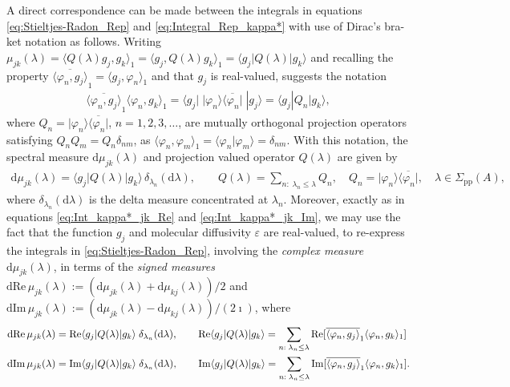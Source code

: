 \documentclass[11pt]{amsart}
\renewcommand{\d}{\mathrm{d}}
\newcommand{\Sigp}{\Sigma_{\text{pp}}}
\begin{document}
A direct correspondence can be made between the integrals in equations
\eqref{eq:Stieltjes-Radon_Rep} and \eqref{eq:Integral_Rep_kappa*} with
use of Dirac's bra-ket notation as follows. Writing  
$\mu_{jk}(\lambda)=\langle Q(\lambda)g_j,g_k\rangle_1=\langle g_j,Q(\lambda)g_k\rangle_1=\langle g_j|Q(\lambda)|g_k\rangle$ and
recalling the property
$\overline{\langle\varphi_n,g_j\rangle}_1=\langle g_j,\varphi_n\rangle_1$ and that $g_j$ is real-valued, suggests  
the notation  
%
\begin{align}\label{eq:Disc_Meas_Weights}
  \overline{\langle\varphi_n,g_j\rangle}_1\langle\varphi_n,g_k\rangle_1
  =\langle g_j|\;|\varphi_n\rangle\overline{\langle\varphi_n|}\;|g_j\rangle
  =\langle g_j|Q_n|g_k\rangle,
\end{align}
%
where $Q_n=|\varphi_n\rangle\overline{\langle\varphi_n|}$, $n=1,2,3,\ldots$, are mutually orthogonal
projection operators satisfying $Q_nQ_m=Q_n\delta_{nm}$, as
$\langle\varphi_n,\varphi_m\rangle_1=\langle\varphi_n|\varphi_m\rangle=\delta_{nm}$. With this notation, the spectral
measure $\d\mu_{jk}(\lambda)$ and projection valued operator $Q(\lambda)$ are
given by   
%
\begin{align}\label{eq:Disc_Spec_Measure_Inf}
  \d\mu_{jk}(\lambda)=\langle g_j|Q(\lambda)|g_k\rangle\,\delta_{\lambda_n}(\d\lambda),\qquad
  Q(\lambda)=\sum_{n:\;\lambda_n\leq\lambda}Q_n, \quad
  Q_n=|\varphi_n\rangle\overline{\langle\varphi_n|},\quad
  \lambda\in\Sigp(A),
\end{align}
%
where $\delta_{\lambda_n}(\d\lambda)$ is the delta measure concentrated at
$\lambda_n$. Moreover, exactly as in equations \eqref{eq:Int_kappa*_jk_Re}
and \eqref{eq:Int_kappa*_jk_Im}, we may use the fact that the function
$g_j$ and molecular diffusivity $\varepsilon$ are real-valued, to
re-express the integrals in \eqref{eq:Stieltjes-Radon_Rep}, involving
the \emph{complex measure} $\d\mu_{jk}(\lambda)$, in terms of the \emph{signed
  measures} $\d\text{Re}\,\mu_{jk}(\lambda):=(\d\mu_{jk}(\lambda)+\d\mu_{kj}(\lambda))/2$ and
$\d\text{Im}\,\mu_{jk}(\lambda):=(\d\mu_{jk}(\lambda)-\d\mu_{kj}(\lambda))/(2\imath)$, where
%
\begin{align}\label{eq:Disc_Spec_Measure_Inf}
  \d\text{Re}\,\mu_{jk}(\lambda)&=\text{Re}\langle g_j|Q(\lambda)|g_k\rangle\;\delta_{\lambda_n}(\d\lambda),
  \qquad
  \text{Re}\langle g_j|Q(\lambda)|g_k\rangle=\sum_{n:\;\lambda_n\leq\lambda}\text{Re}[\overline{\langle\varphi_n,g_j\rangle}_1\langle\varphi_n,g_k\rangle_1]
  \\
  \d\text{Im}\,\mu_{jk}(\lambda)&=\text{Im}\langle g_j|Q(\lambda)|g_k\rangle\;\delta_{\lambda_n}(\d\lambda),
  \qquad
  \text{Im}\langle g_j|Q(\lambda)|g_k\rangle=\sum_{n:\;\lambda_n\leq\lambda}\text{Im}[\overline{\langle\varphi_n,g_j\rangle}_1\langle\varphi_n,g_k\rangle_1].
  \notag
\end{align}
%
\end{document}
